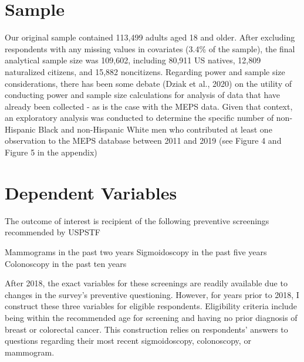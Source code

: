 \documentclass[../main.tex]{subfiles}
\begin{document}
\section{Sample}

Our original sample contained 113,499 adults aged 18 and older. After excluding respondents with any missing values in covariates (3.4\% of the sample), the final
analytical sample size was 109,602, including 80,911 US natives, 12,809 naturalized citizens, and 15,882 noncitizens. Regarding power and sample size
considerations, there has been some debate (Dziak et al., 2020) on the utility of conducting power and sample size calculations for analysis of data that have already been collected -
as is the case with the MEPS data. Given that context, an exploratory analysis was conducted to determine the specific number of non-Hispanic Black and non-Hispanic White men who contributed at least one observation to the MEPS database between 2011 and 2019 (see Figure 4 and Figure 5 in the appendix)

\section{Dependent Variables}

The outcome of interest is recipient of the following preventive screenings recommended by USPSTF

Mammograms in the past two years
Sigmoidoscopy in the past five years
Colonoscopy in the past ten years

After 2018, the exact variables for these screenings are readily available due to changes in the survey's preventive questioning. However, for years prior to 2018, I construct these three variables for eligible respondents. Eligibility criteria include being within the recommended age for screening and having no prior diagnosis of breast or colorectal cancer. This construction relies on respondents' answers to questions regarding their most recent sigmoidoscopy, colonoscopy, or mammogram.
\end{document}

